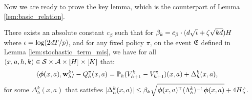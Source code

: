 Now we are ready to prove the key lemma, which is the counterpart of Lemma \ref{lem:basic_relation}.

\begin{lemma}\label{lem:basic_relation_mis}There exists an absolute constant $c_\beta$ such that for $\beta_k = c_\beta \cdot (d\sqrt{\iota}+\zeta \sqrt{kd})H$ where $\iota = \log (2dT/p)$, and
for any fixed policy $\pi$, on the event $\mathfrak{E}$ defined in Lemma \ref{lem:stochastic_term_mis}, we have for all $(x, a, h, k) \in \mathcal{S}\times\mathcal{A}\times[H]\times[K]$ that:
\begin{equation*}
\langle\bm{\phi}(x, a), \mathbf{w}^k_h\rangle - Q_h^\pi(x, a)  =  \mathbb{P}_h (V^{k}_{h+1} - V^{\pi}_{h+1})(x, a) + \Delta^k_h(x, a),
\end{equation*}
for some $\Delta^k_h(x, a)$ that satisfies $|\Delta^k_h(x, a)| \le \beta_k \sqrt{\bm{\phi}(x, a)^{\top} (\Lambda^k_h)^{-1}  \bm{\phi}(x, a)} + 4H\zeta$.
\end{lemma}

